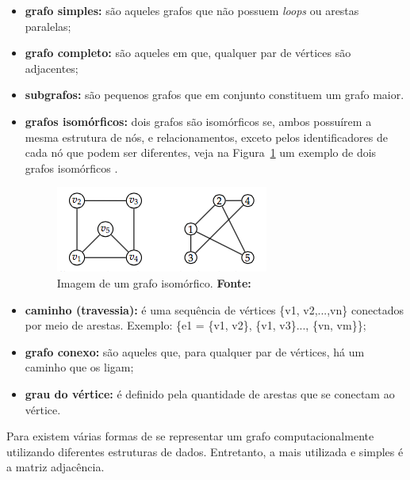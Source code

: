 \begin{itemize}
	\item \textbf{grafo simples:} são aqueles grafos que não possuem \textit{loops} ou arestas paralelas;
	
	\item \textbf{grafo completo:} são aqueles em que, qualquer par de vértices são adjacentes;
	
	\item \textbf{subgrafos:} são pequenos grafos que em conjunto constituem um grafo maior.
	
	\item \textbf{grafos isomórficos:} dois grafos são isomórficos se, ambos possuírem a mesma estrutura de nós, e relacionamentos, exceto pelos identificadores de cada nó que podem ser diferentes, veja na Figura~\ref{fig:ilustracao_grafo_isomorfico} um exemplo de dois grafos isomórficos \cite{harju_graph_theory}.
	
	\begin{figure}[h!]
		\centerline{\includegraphics[scale=1]{./imagens/grafos_isomorficos.png}}
		\caption[Imagem de um grafo isomórfico]
		{Imagem de um grafo isomórfico. \textbf{Fonte:} }
		\label{fig:ilustracao_grafo_isomorfico}
	\end{figure}
	
	\item \textbf{caminho (travessia):} é uma sequência de vértices \{v1, v2,...,vn\} conectados por meio de arestas. Exemplo: \{e1 = \{v1, v2\}, \{v1, v3\}..., \{vn, vm\}\};

	\item \textbf{grafo conexo:} são aqueles que, para qualquer par de vértices, há um caminho que os ligam;
	
	\item \textbf{grau do vértice:} é definido pela quantidade de arestas que se conectam ao vértice.
	
\end{itemize}

Para  existem várias formas de se representar um grafo computacionalmente utilizando diferentes estruturas de dados. Entretanto, a mais utilizada e simples é a matriz adjacência.

